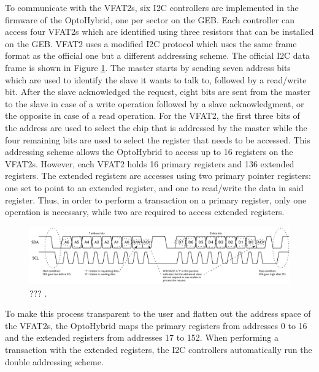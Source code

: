       To communicate with the VFAT2s, six I2C controllers are implemented in the firmware of the OptoHybrid, one per sector on the GEB. Each controller can access four VFAT2s which are identified using three resistors that can be installed on the GEB. VFAT2 uses a modified I2C protocol which uses the same frame format as the official one but a different addressing scheme. The official I2C data frame is shown in Figure \ref{fig:II-3-i2c}. The master starts by sending seven address bits which are used to identify the slave it wants to talk to, followed by a read/write bit. After the slave acknowledged the request, eight bits are sent from the master to the slave in case of a write operation followed by a slave acknowledgment, or the opposite in case of a read operation. For the VFAT2, the first three bits of the address are used to select the chip that is addressed by the master while the four remaining bits are used to select the register that needs to be accessed. This addressing scheme allows the OptoHybrid to access up to 16 registers on the VFAT2s. However, each VFAT2 holds 16 primary registers and 136 extended registers. The extended registers are accesses using two primary pointer registers: one set to point to an extended register, and one to read/write the data in said register. Thus, in order to perform a transaction on a primary register, only one operation is necessary, while two are required to access extended registers. \\

      \begin{figure}[h!]
        \centering
        \includegraphics[width=\textwidth]{img/II-3-test-beam/i2c.png}
        \caption{??? \cite{I2C}.}
        \label{fig:II-3-i2c}
      \end{figure}

      To make this process transparent to the user and flatten out the address space of the VFAT2s, the OptoHybrid maps the primary registers from addresses 0 to 16 and the extended registers from addresses 17 to 152. When performing a transaction with the extended registers, the I2C controllers automatically run the double addressing scheme. \\

